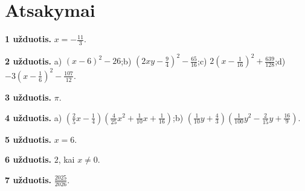 \documentclass[12pt, a4paper]{article}
\begin{document}
\newpage

\section{Atsakymai}

\noindent\textbf{1 užduotis.} $x=-\frac{11}{3}$.\par

\noindent\textbf{2 užduotis.} a) $(x-6)^2-26$;\quad b) $\left(2xy-\frac94\right)^2-\frac{65}{16}$;\quad c) $2\left(x-\frac1{16}\right)^2+\frac{639}{128}$;\quad d) $-3\left(x-\frac16\right)^2-\frac{107}{12}$.\par

\noindent\textbf{3 užduotis.} $\pi$.\par

\noindent\textbf{4 užduotis.} a) $\left(\frac{2}{5}x-\frac14\right)\left(\frac{4}{25}x^2+\frac{1}{10}x+\frac{1}{16}\right)$;\quad b) $\left(\frac{1}{10}y+\frac43\right)\left(\frac{1}{100}y^2-\frac{2}{15}y+\frac{16}{9}\right)$.\par

\noindent\textbf{5 užduotis.} $x=6$.

\noindent\textbf{6 užduotis.} $2$, kai $x\ne0$.

\noindent\textbf{7 užduotis.} $\frac{2025}{2026}$.
\end{document}
